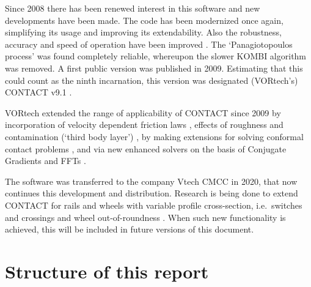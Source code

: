 \documentclass[12pt]{report}
\begin{document}
Since 2008 there has been renewed interest in this software and new
developments have been made. The code has been modernized once again,
simplifying its usage and improving its extendability. Also the robustness,
accuracy and speed of operation have been improved
\cite{Vollebregt2009a-cm2009}. The `Panagiotopoulos process' was found
completely reliable, whereupon the slower KOMBI algorithm was removed. A
first public version was published in 2009. Estimating that this could count
as the ninth incarnation, this version was designated (VORtech's) CONTACT
v9.1 \cite{Vollebregt2009b-userguide-v9}.

VORtech extended the range of applicability of CONTACT since 2009 by
incorporation of velocity dependent friction laws
\cite{Vollebregt2014c-tractcurv,Vollebregt2012a-quasistd}, effects of
roughness and contamination (`third body layer') 
\cite{Vollebregt2014c-tractcurv,Vollebregt2021a-soa-paper,
Vollebregt2024a-vt-fra}, by making extensions for solving conformal
contact problems \cite{Vollebregt2018b-corrigendum,
Vollebregt2020c-distr-force,Vollebregt2014d-conformal}, and via new
enhanced solvers on the basis of Conjugate Gradients and FFTs 
\cite{Vollebregt2014a-fftprec,Zhao_Jing2015a-tangcg}. 

The software was transferred to the company Vtech CMCC in 2020, that now
continues this development and distribution. Research is being done to
extend CONTACT for rails and wheels with variable profile cross-section,
i.e.\ switches and crossings \cite{Vollebregt2023a-iavsd2023} and wheel
out-of-roundness \cite{Vollebregt2024b-railways,
Vollebregt2024c-contact-geom}. When such new functionality is achieved,
this will be included in future versions of this document.

\section{Structure of this report}
\end{document}
